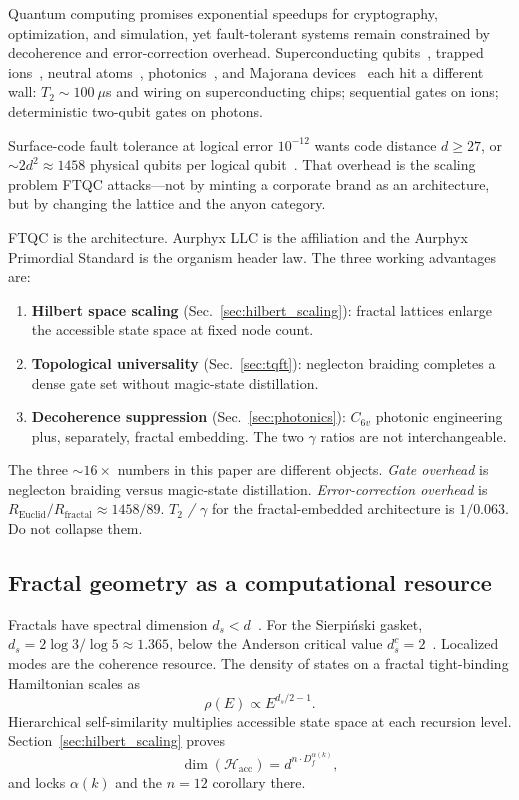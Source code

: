 \documentclass[aps,prx,twocolumn,superscriptaddress,floatfix]{revtex4-2}
\newcommand{\Hilbert}{\mathcal{H}}
\newcommand{\Df}{D_f}
\theoremstyle{plain}
\theoremstyle{definition}
\begin{document}
Quantum computing promises exponential speedups for cryptography, optimization, and simulation, yet fault-tolerant systems remain constrained by decoherence and error-correction overhead. Superconducting qubits~\cite{Arute2019}, trapped ions~\cite{Monroe2013}, neutral atoms~\cite{Saffman2010}, photonics~\cite{Kok2007}, and Majorana devices~\cite{Kitaev2003} each hit a different wall: $T_2 \sim 100~\mu$s and wiring on superconducting chips; sequential gates on ions; deterministic two-qubit gates on photons.

Surface-code fault tolerance at logical error $10^{-12}$ wants code distance $d \geq 27$, or $\sim 2d^2 \approx 1458$ physical qubits per logical qubit~\cite{Fowler2012}. That overhead is the scaling problem FTQC attacks---not by minting a corporate brand as an architecture, but by changing the lattice and the anyon category.

FTQC is the architecture. Aurphyx LLC is the affiliation and the Aurphyx Primordial Standard is the organism header law. The three working advantages are:

\begin{enumerate}
\item \textbf{Hilbert space scaling} (Sec.~\ref{sec:hilbert_scaling}): fractal lattices enlarge the accessible state space at fixed node count.
\item \textbf{Topological universality} (Sec.~\ref{sec:tqft}): neglecton braiding completes a dense gate set without magic-state distillation.
\item \textbf{Decoherence suppression} (Sec.~\ref{sec:photonics}): $C_{6v}$ photonic engineering plus, separately, fractal embedding. The two $\gamma$ ratios are not interchangeable.
\end{enumerate}

The three $\sim 16\times$ numbers in this paper are different objects. \emph{Gate overhead} is neglecton braiding versus magic-state distillation. \emph{Error-correction overhead} is $R_{\mathrm{Euclid}}/R_{\mathrm{fractal}} \approx 1458/89$. \emph{$T_2$ / $\gamma$} for the fractal-embedded architecture is $1/0.063$. Do not collapse them.

\subsection{Fractal geometry as a computational resource}

Fractals have spectral dimension $d_s < d$~\cite{Rammal1984,Alexander1982}. For the Sierpi\'{n}ski gasket, $d_s = 2\log 3/\log 5 \approx 1.365$, below the Anderson critical value $d_s^c = 2$~\cite{Anderson1958}. Localized modes are the coherence resource. The density of states on a fractal tight-binding Hamiltonian scales as
\begin{equation}
\rho(E) \propto E^{d_s/2 - 1}.
\end{equation}
Hierarchical self-similarity multiplies accessible state space at each recursion level. Section~\ref{sec:hilbert_scaling} proves
\begin{equation}
\dim(\Hilbert_{\mathrm{acc}}) = d^{n \cdot \Df^{\alpha(k)}},
\label{eq:scaling_preview}
\end{equation}
and locks $\alpha(k)$ and the $n=12$ corollary there.
\end{document}
